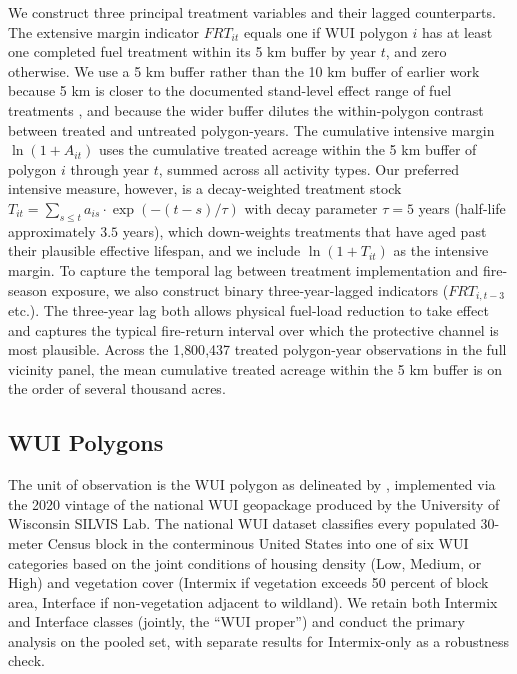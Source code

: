 \documentclass[12pt, letterpaper]{article}
\begin{document}
We construct three principal treatment variables and their lagged counterparts. The extensive margin indicator $FRT_{it}$ equals one if WUI polygon $i$ has at least one completed fuel treatment within its 5 km buffer by year $t$, and zero otherwise. We use a 5 km buffer rather than the 10 km buffer of earlier work because 5 km is closer to the documented stand-level effect range of fuel treatments \citep{stephens2012}, and because the wider buffer dilutes the within-polygon contrast between treated and untreated polygon-years. The cumulative intensive margin $\ln(1 + A_{it})$ uses the cumulative treated acreage within the 5 km buffer of polygon $i$ through year $t$, summed across all activity types. Our preferred intensive measure, however, is a decay-weighted treatment stock $T_{it} = \sum_{s \leq t} a_{is} \cdot \exp(-(t - s)/\tau)$ with decay parameter $\tau = 5$ years (half-life approximately $3.5$ years), which down-weights treatments that have aged past their plausible effective lifespan, and we include $\ln(1 + T_{it})$ as the intensive margin. To capture the temporal lag between treatment implementation and fire-season exposure, we also construct binary three-year-lagged indicators ($FRT_{i,t-3}$ etc.). The three-year lag both allows physical fuel-load reduction to take effect and captures the typical fire-return interval over which the protective channel is most plausible. Across the 1{,}800{,}437 treated polygon-year observations in the full vicinity panel, the mean cumulative treated acreage within the 5 km buffer is on the order of several thousand acres.

\subsection{WUI Polygons}

The unit of observation is the WUI polygon as delineated by \citet{radeloff2018}, implemented via the 2020 vintage of the national WUI geopackage produced by the University of Wisconsin SILVIS Lab. The national WUI dataset classifies every populated 30-meter Census block in the conterminous United States into one of six WUI categories based on the joint conditions of housing density (Low, Medium, or High) and vegetation cover (Intermix if vegetation exceeds 50 percent of block area, Interface if non-vegetation adjacent to wildland). We retain both Intermix and Interface classes (jointly, the ``WUI proper'') and conduct the primary analysis on the pooled set, with separate results for Intermix-only as a robustness check.
\end{document}

